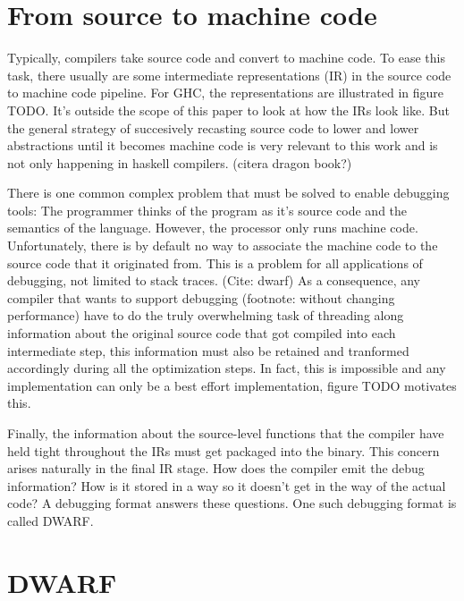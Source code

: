 
\section{From source to machine code}

Typically, compilers take source code and convert to machine code. To ease this
task, there usually are some intermediate representations (IR) in the source
code to machine code pipeline.  For GHC, the representations are illustrated in
figure TODO. It's outside the scope of this paper to look at how the IRs
look like. But the general strategy of succesively recasting source code to lower and
lower abstractions until it becomes machine code is very relevant to this work
and is not only happening in haskell compilers. (citera dragon book?)

There is one common complex problem that must be solved to enable debugging
tools: The programmer thinks of the program as it's source code and the
semantics of the language. However, the processor only runs machine code.
Unfortunately, there is by default no way to associate the machine code to the
source code that it originated from. This is a problem for all applications of
debugging, not limited to stack traces. (Cite: dwarf) As a consequence, any
compiler that wants to support debugging (footnote: without changing
performance) have to do the truly overwhelming task of threading along
information about the original source code that got compiled into each
intermediate step, this information must also be retained and tranformed
accordingly during all the optimization steps. In fact, this is impossible and
any implementation can only be a best effort implementation, figure TODO
motivates this.

Finally, the information  about the source-level functions that the compiler
have held tight throughout the IRs must get packaged into the binary. This
concern arises naturally in the final IR stage.  How does the compiler emit the
debug information? How is it stored in a way so it doesn't get in the way of the
actual code?  A debugging format answers these questions. One such debugging
format is called DWARF.

\section{DWARF}

